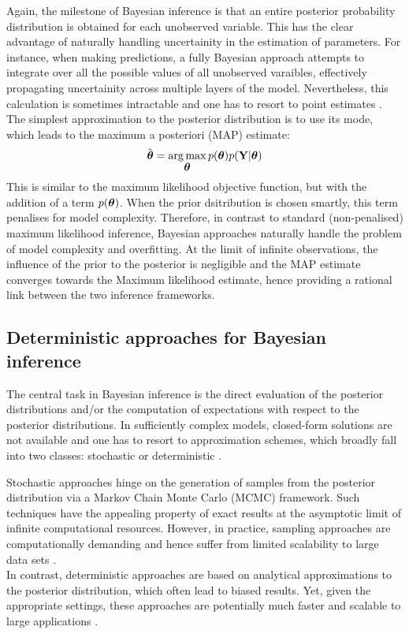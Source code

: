 Again, the milestone of Bayesian inference is that an entire posterior probability distribution is obtained for each unobserved variable. This has the clear advantage of naturally handling uncertainity in the estimation of parameters. For instance, when making predictions, a fully Bayesian approach attempts to integrate over all the possible values of all unobserved varaibles, effectively propagating uncertainity across multiple layers of the model. Nevertheless, this calculation is sometimes intractable and one has to resort to point estimates \cite{Bishop,Murphy,Gelman2013}. The simplest approximation to the posterior distribution is to use its mode, which leads to the maximum a posteriori (MAP) estimate:
\[
	\hat{\mbox{\boldmath $\theta$}} = \operatorname*{arg\,max}_{\mbox{\boldmath $\theta$}} p(\mbox{\boldmath $\theta$}) p({\bf Y}|\mbox{\boldmath $\theta$}) 
\]
This is similar to the maximum likelihood objective function, but with the addition of a term $p(\mbox{\boldmath $\theta$})$. When the prior dsitribution is chosen smartly, this term penalises for model complexity. Therefore, in contrast to standard (non-penalised) maximum likelihood inference, Bayesian approaches naturally handle the problem of model complexity and overfitting\cite{Bishop,Murphy,Gelman2013}. At the limit of infinite observations, the influence of the prior to the posterior is negligible and the MAP estimate converges towards the Maximum likelihood estimate, hence providing a rational link between the two inference frameworks.

\subsection{Deterministic approaches for Bayesian inference} \label{section:deterministic_bayesian_inference}
The central task in Bayesian inference is the direct evaluation of the posterior distributions and/or the computation of expectations with respect to the posterior distributions. In sufficiently complex models, closed-form solutions are not available and one has to resort to approximation schemes, which broadly fall into two classes: stochastic or deterministic \cite{Gelman2013,Blei2016}. 

Stochastic approaches hinge on the generation of samples from the posterior distribution via a Markov Chain Monte Carlo (MCMC) framework. Such techniques have the appealing property of exact results at the asymptotic limit of infinite computational resources. However, in practice, sampling approaches are computationally demanding and hence suffer from limited scalability to large data sets \cite{Blei2016}. \\
In contrast, deterministic approaches are based on analytical approximations to the posterior distribution, which often lead to biased results. Yet, given the appropriate settings, these approaches are potentially much faster and scalable to large applications \cite{Bishop,Murphy,Blei2016}.

